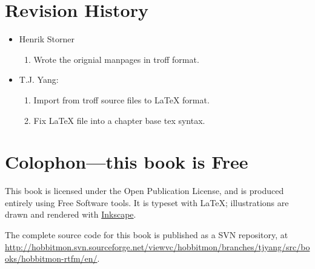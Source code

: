 \section{Revision History}

\begin{itemize}
\item Henrik Storner
 \begin{enumerate}
  \item Wrote the orignial manpages in troff format.
 \end{enumerate}

\item T.J. Yang:
 \begin{enumerate}
  \item Import from troff source files to LaTeX format.
  \item Fix LaTeX file into a chapter base tex syntax.
 \end{enumerate}

\end{itemize}

\section{Colophon---this book is Free}

This book is licensed under the Open Publication License, and is
produced entirely using Free Software tools.  It is typeset with
\LaTeX{}; illustrations are drawn and rendered with
\href{http://www.inkscape.org/}{Inkscape}.

The complete source code for this book is published as a SVN
repository, at
\url{http://hobbitmon.svn.sourceforge.net/viewvc/hobbitmon/branches/tjyang/src/books/hobbitmon-rtfm/en/}.


